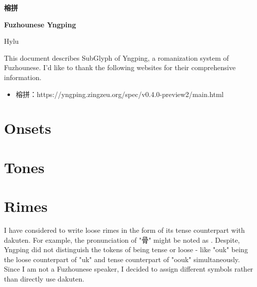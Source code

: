 \documentclass[12pt]{article}
\begin{document}

\begin{center}
    {\Huge \textbf{榕拼} \par}
    {\Huge \textbf{Fuzhounese Yngping} \par}
    {\Large Hylu \par}
    \hrulefill
\end{center}

This document describes SubGlyph of Yngping, a romanization system of Fuzhounese. I'd like to thank the following websites for their comprehensive information. \par
\begin{itemize}
	\item 榕拼：https://yngping.zingzeu.org/spec/v0.4.0-preview2/main.html
\end{itemize}

\section{Onsets}
%
\clearpage

\section{Tones}
%

\section{Rimes}
\clearpage
I have considered to write loose rimes in the form of its tense counterpart with dakuten. For example, the pronunciation of "骨" might be noted as . Despite, Yngping did not distinguish the tokens of being tense or loose - like "ouk" being the loose counterpart of "uk" and tense counterpart of "oouk" simultaneously. Since I am not a Fuzhounese speaker, I decided to assign different symbols rather than directly use dakuten. \par
%
\end{document}
